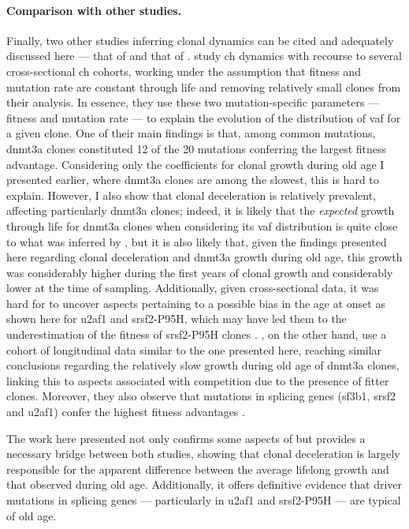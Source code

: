 \paragraph{Comparison with other studies.} Finally, two other studies inferring clonal dynamics can be cited and adequately discussed here --- that of  \cite{Watson2020-pz} and that of  \cite{Robertson2021-sw}.  study \ac{ch} dynamics with recourse to several cross-sectional \ac{ch} cohorts, working under the assumption that fitness and mutation rate are constant through life and removing relatively small clones from their analysis. In essence, they use these two mutation-specific parameters --- fitness and mutation rate --- to explain the evolution of the distribution of \ac{vaf} for a given clone. One of their main findings is that, among common mutations, \ac{dnmt3a} clones constituted 12 of the 20 mutations conferring the largest fitness advantage. Considering only the coefficients for clonal growth during old age I presented earlier, where \ac{dnmt3a} clones are among the slowest, this is hard to explain. However, I also show that clonal deceleration is relatively prevalent, affecting particularly \ac{dnmt3a} clones; indeed, it is likely that the \textit{expected} growth through life for \ac{dnmt3a} clones when considering its \ac{vaf} distribution is quite close to what was inferred by , but it is also likely that, given the findings presented here regarding clonal deceleration and \ac{dnmt3a} growth during old age, this growth was considerably higher during the first years of clonal growth and considerably lower at the time of sampling. Additionally, given cross-sectional data, it was hard for  to uncover aspects pertaining to a possible bias in the age at onset as shown here for \ac{u2af1} and \ac{srsf2}-P95H, which may have led them to the underestimation of the fitness of \ac{srsf2}-P95H clones \cite{Watson2020-pz}. , on the other hand, use a cohort of longitudinal data similar to the one presented here, reaching similar conclusions regarding the relatively slow growth during old age of \ac{dnmt3a} clones, linking this to aspects associated with competition due to the presence of fitter clones. Moreover, they also observe that mutations in splicing genes (\ac{sf3b1}, \ac{srsf2} and \ac{u2af1}) confer the highest fitness advantages \cite{Robertson2021-sw}. 

The work here presented not only confirms some aspects of but provides a necessary bridge between both studies, showing that clonal deceleration is largely responsible for the apparent difference between the average lifelong growth and that observed during old age. Additionally, it offers definitive evidence that driver mutations in splicing genes --- particularly in \ac{u2af1} and \ac{srsf2}-P95H --- are typical of old age.

